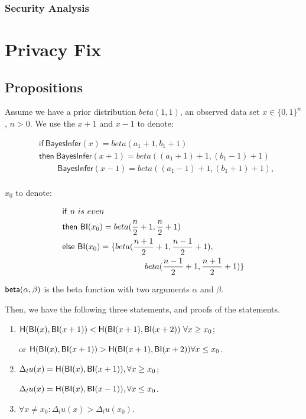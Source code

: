 \documentclass{article}
\begin{document}
\subsubsection{Security Analysis}


\section{Privacy Fix}

\subsection{Propositions}
Assume we have a prior distribution $beta(1,1)$, an observed data set $x \in \{0,1\}^n$, $n>0$. We use the $x+1$ and $x-1$ to denote:
\begin{small}
\begin{equation*}
\begin{split}
&\mathsf{if\ BayesInfer}(x) = beta(a_1 + 1,b_1 + 1)\\
&\mathsf{then}\mathsf{\ BayesInfer}(x + 1) = beta((a_1 + 1) +1, (b_1 - 1)+1)\\
&\quad \quad \mathsf{\ BayesInfer}(x - 1) = beta((a_1 - 1) +1, (b_1 + 1)+1),\\
\end{split}
\end{equation*}
\end{small}

$x_0$ to denote:
\begin{small}
\begin{equation*}
\begin{split}
&\mathsf{if}\ n\ is\ even\\
&\mathsf{then}\ \mathsf{BI}(x_0) = beta(\frac{n}{2} + 1, \frac{n}{2} + 1)\\
&\mathsf{else}\ \mathsf{BI}(x_0) = \{beta(\frac{n+1}{2} + 1, \frac{n-1}{2} + 1),\\
&\quad \quad \quad \quad \quad \quad \quad \quad \quad \quad beta(\frac{n - 1}{2} + 1, \frac{n + 1}{2} + 1)\}
\end{split}
\end{equation*}
\end{small}

$\mathsf{beta}(\alpha, \beta)$ is the beta function with two arguments $\alpha$ and $\beta$.

Then, we have the following three statements, and proofs of the statements.
\renewcommand{\labelenumi}{\Roman{enumi}}
\begin{enumerate}
\item $\mathsf{H} (\mathsf{BI}(x), \mathsf{BI}(x + 1)) < \mathsf{H} (\mathsf{BI}(x + 1), \mathsf{BI}(x + 2))\ \forall x \geq x_0$;

or $\mathsf{H} (\mathsf{BI}(x), \mathsf{BI}(x + 1)) > \mathsf{H} (\mathsf{BI}(x + 1), \mathsf{BI}(x + 2))\forall x \leq x_0$.

\item $\Delta_{l}u(x) = \mathsf{H} (\mathsf{BI}(x),\mathsf{BI}(x + 1)),\forall x \geq x_0$;

$\Delta_{l}u(x) = \mathsf{H} (\mathsf{BI}(x),\mathsf{BI}(x - 1)),\forall x \leq x_0$.

\item $\forall x \neq x_0: \Delta_{l}u(x) > \Delta_{l}u(x_0)$.
\end{enumerate}
\end{document}
